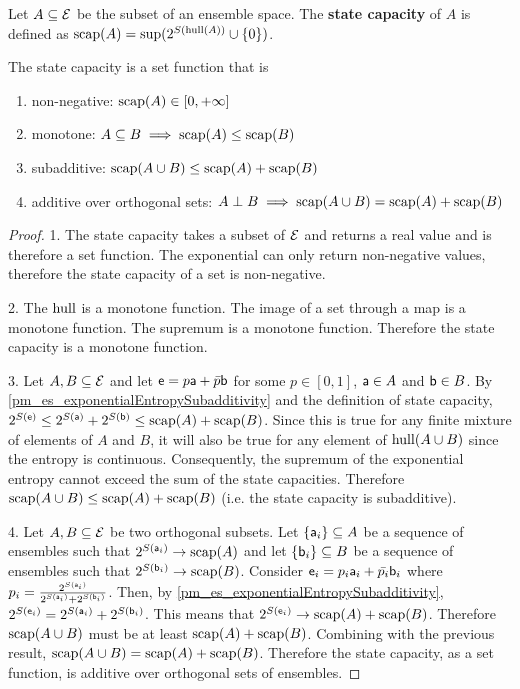 \begin{mathSection}
\begin{defn}
	Let $A \subseteq \Ens$ be the subset of an ensemble space. The \textbf{state capacity} of $A$ is defined as $\capacity(A) = \sup(2^{S(\hull(A))}\cup\{0\})$.
\end{defn}

\begin{prop}
	The state capacity is a set function that is
	\begin{enumerate}
		\item non-negative: $\capacity(A) \in [0, +\infty]$
		\item monotone: $A \subseteq B \implies \capacity(A) \leq \capacity(B)$
		\item subadditive: $\capacity(A \cup B) \leq \capacity(A) + \capacity(B)$
		\item additive over orthogonal sets: $A \ortho B \implies \capacity(A \cup B) = \capacity(A) + \capacity(B)$ 
	\end{enumerate}
\end{prop}

\begin{proof}
	1. The state capacity takes a subset of $\Ens$ and returns a real value and is therefore a set function. The exponential can only return non-negative values, therefore the state capacity of a set is non-negative. 
	
	2. The $\hull$ is a monotone function. The image of a set through a map is a monotone function. The supremum is a monotone function. Therefore the state capacity is a monotone function.
	
	3. Let $A, B \subseteq \Ens$ and let $\ens = p \ens[a] + \bar{p} \ens[b]$ for some $p \in [0,1]$, $\ens[a] \in A$ and $\ens[b] \in B$. By \ref{pm_es_exponentialEntropySubadditivity} and the definition of state capacity, $2^{S(\ens)} \leq 2^{S(\ens[a])} + 2^{S(\ens[b])} \leq \capacity(A) + \capacity(B)$. Since this is true for any finite mixture of elements of $A$ and $B$, it will also be true for any element of $\hull(A \cup B)$ since the entropy is continuous. Consequently, the supremum of the exponential entropy cannot exceed the sum of the state capacities. Therefore $\capacity(A \cup B) \leq \capacity(A) + \capacity(B)$ (i.e. the state capacity is subadditive).
	
	4. Let $A, B \subseteq \Ens$ be two orthogonal subsets. Let $\{\ens[a]_i\} \subseteq A$ be a sequence of ensembles such that $2^{S(\ens[a]_i)} \to \capacity(A)$ and let $\{\ens[b]_i\} \subseteq B$ be a sequence of ensembles such that $2^{S(\ens[b]_i)} \to \capacity(B)$. Consider $\ens_i = p_i \ens[a]_i + \bar{p_i} \ens[b]_i$ where $p_i = \frac{2^{S(\ens[a]_i)}}{2^{S(\ens[a]_i)} + 2^{S(\ens[b]_i)}}$. Then, by \ref{pm_es_exponentialEntropySubadditivity}, $2^{S(\ens_i)} = 2^{S(\ens[a]_i)} + 2^{S(\ens[b]_i)}$. This means that $2^{S(\ens_i)} \to \capacity(A) + \capacity(B)$. Therefore $\capacity(A \cup B)$ must be at least $\capacity(A) + \capacity(B)$. Combining with the previous result, $\capacity(A \cup B) = \capacity(A) + \capacity(B)$. Therefore the state capacity, as a set function, is additive over orthogonal sets of ensembles.
\end{proof}


\end{mathSection}

